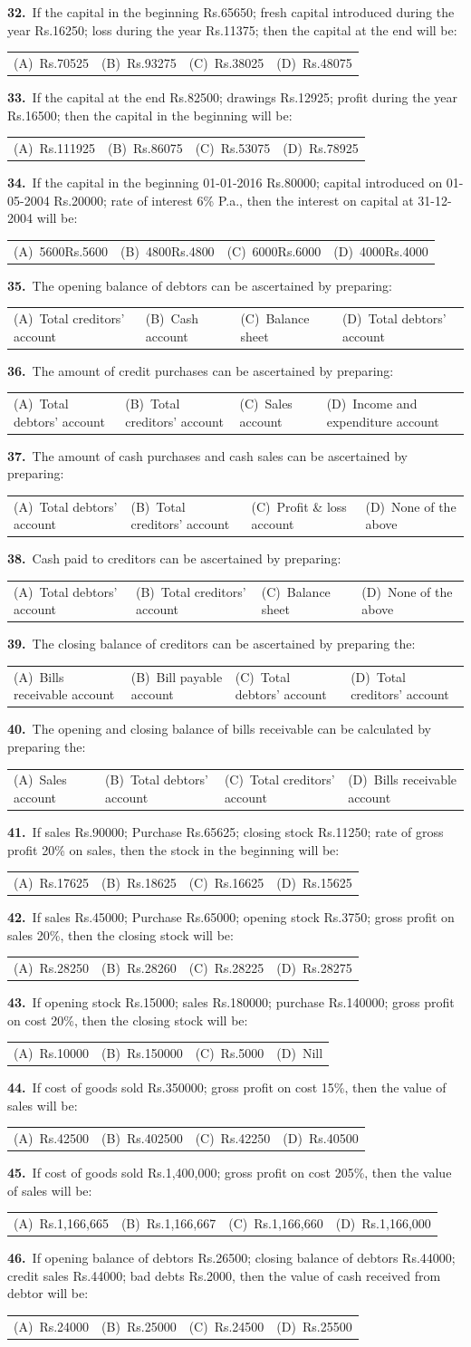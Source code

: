 \documentclass[11pt,a4paper]{article}
\makeatletter
\newcommand{\mcq}[6]{%
  \Needspace{4\baselineskip}%
  \par\medskip\noindent\textbf{#1.}\ #2\par\nopagebreak
  \noindent\begin{tabularx}{\linewidth}{@{\hspace{1.5em}}*{4}{>{\raggedright\arraybackslash}X}@{}}
    (A)~#3 & (B)~#4 & (C)~#5 & (D)~#6
  \end{tabularx}\par}
\makeatother
\begin{document}
\mcq{32}{If the capital in the beginning Rs.65650; fresh capital introduced during the year Rs.16250; loss during the year Rs.11375; then the capital at the end will be:}{Rs.70525}{Rs.93275}{Rs.38025}{Rs.48075}
\mcq{33}{If the capital at the end Rs.82500; drawings Rs.12925; profit during the year Rs.16500; then the capital in the beginning will be:}{Rs.111925}{Rs.86075}{Rs.53075}{Rs.78925}
\mcq{34}{If the capital in the beginning 01-01-2016 Rs.80000; capital introduced on 01-05-2004 Rs.20000; rate of interest 6\% P.a., then the interest on capital at 31-12-2004 will be:}{5600Rs.5600}{4800Rs.4800}{6000Rs.6000}{4000Rs.4000}
\mcq{35}{The opening balance of debtors can be ascertained by preparing:}{Total creditors’ account}{Cash account}{Balance sheet}{Total debtors’ account}
\mcq{36}{The amount of credit purchases can be ascertained by preparing:}{Total debtors’ account}{Total creditors’ account}{Sales account}{Income and expenditure account}
\mcq{37}{The amount of cash purchases and cash sales can be ascertained by preparing:}{Total debtors’ account}{Total creditors’ account}{Profit \& loss account}{None of the above}
\mcq{38}{Cash paid to creditors can be ascertained by preparing:}{Total debtors’ account}{Total creditors’ account}{Balance sheet}{None of the above}
\mcq{39}{The closing balance of creditors can be ascertained by preparing the:}{Bills receivable account}{Bill payable account}{Total debtors’ account}{Total creditors’ account}
\mcq{40}{The opening and closing balance of bills receivable can be calculated by preparing the:}{Sales account}{Total debtors’ account}{Total creditors’ account}{Bills receivable account}
\mcq{41}{If sales Rs.90000; Purchase Rs.65625; closing stock Rs.11250; rate of gross profit 20\% on sales, then the stock in the beginning will be:}{Rs.17625}{Rs.18625}{Rs.16625}{Rs.15625}
\mcq{42}{If sales Rs.45000; Purchase Rs.65000; opening stock Rs.3750; gross profit on sales 20\%, then the closing stock will be:}{Rs.28250}{Rs.28260}{Rs.28225}{Rs.28275}
\mcq{43}{If opening stock Rs.15000; sales Rs.180000; purchase Rs.140000; gross profit on cost 20\%, then the closing stock will be:}{Rs.10000}{Rs.150000}{Rs.5000}{Nill}
\mcq{44}{If cost of goods sold Rs.350000; gross profit on cost 15\%, then the value of sales will be:}{Rs.42500}{Rs.402500}{Rs.42250}{Rs.40500}
\mcq{45}{If cost of goods sold Rs.1,400,000; gross profit on cost 205\%, then the value of sales will be:}{Rs.1,166,665}{Rs.1,166,667}{Rs.1,166,660}{Rs.1,166,000}
\mcq{46}{If opening balance of debtors Rs.26500; closing balance of debtors Rs.44000; credit sales Rs.44000; bad debts Rs.2000, then the value of cash received from debtor will be:}{Rs.24000}{Rs.25000}{Rs.24500}{Rs.25500}
\end{document}

